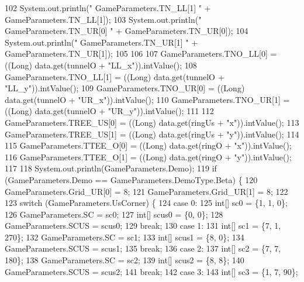 \begin{DoxyCode}
102       System.out.println(\textcolor{stringliteral}{" GameParameters.TN\_LL[1] "} + GameParameters.TN\_LL[1]);
103       System.out.println(\textcolor{stringliteral}{" GameParameters.TN\_UR[0] "} + GameParameters.TN\_UR[0]);
104       System.out.println(\textcolor{stringliteral}{" GameParameters.TN\_UR[1] "} + GameParameters.TN\_UR[1]);
105 
106 
107       GameParameters.TNO\_LL[0] = ((Long) data.get(tunnelO + \textcolor{stringliteral}{"LL\_x"})).intValue();
108       GameParameters.TNO\_LL[1] = ((Long) data.get(tunnelO + \textcolor{stringliteral}{"LL\_y"})).intValue();
109       GameParameters.TNO\_UR[0] = ((Long) data.get(tunnelO + \textcolor{stringliteral}{"UR\_x"})).intValue();
110       GameParameters.TNO\_UR[1] = ((Long) data.get(tunnelO + \textcolor{stringliteral}{"UR\_y"})).intValue();
111 
112       GameParameters.TREE\_US[0] = ((Long) data.get(ringUs + \textcolor{stringliteral}{"x"})).intValue();
113       GameParameters.TREE\_US[1] = ((Long) data.get(ringUs + \textcolor{stringliteral}{"y"})).intValue();
114 
115       GameParameters.TTEE\_O[0] = ((Long) data.get(ringO + \textcolor{stringliteral}{"x"})).intValue();
116       GameParameters.TTEE\_O[1] = ((Long) data.get(ringO + \textcolor{stringliteral}{"y"})).intValue();
117 
118       System.out.println(GameParameters.Demo);
119       \textcolor{keywordflow}{if} (GameParameters.Demo == GameParameters.DemoType.Beta) \{
120         GameParameters.Grid\_UR[0] = 8;
121         GameParameters.Grid\_UR[1] = 8;
122 
123         \textcolor{keywordflow}{switch} (GameParameters.UsCorner) \{
124           \textcolor{keywordflow}{case} 0:
125             \textcolor{keywordtype}{int}[] sc0 = \{1, 1, 0\};
126             GameParameters.SC = sc0;
127             \textcolor{keywordtype}{int}[] scus0 = \{0, 0\};
128             GameParameters.SCUS = scus0;
129             \textcolor{keywordflow}{break};
130           \textcolor{keywordflow}{case} 1:
131             \textcolor{keywordtype}{int}[] sc1 = \{7, 1, 270\};
132             GameParameters.SC = sc1;
133             \textcolor{keywordtype}{int}[] scus1 = \{8, 0\};
134             GameParameters.SCUS = scus1;
135             \textcolor{keywordflow}{break};
136           \textcolor{keywordflow}{case} 2:
137             \textcolor{keywordtype}{int}[] sc2 = \{7, 7, 180\};
138             GameParameters.SC = sc2;
139             \textcolor{keywordtype}{int}[] scus2 = \{8, 8\};
140             GameParameters.SCUS = scus2;
141             \textcolor{keywordflow}{break};
142           \textcolor{keywordflow}{case} 3:
143             \textcolor{keywordtype}{int}[] sc3 = \{1, 7, 90\};

\end{DoxyCode}
